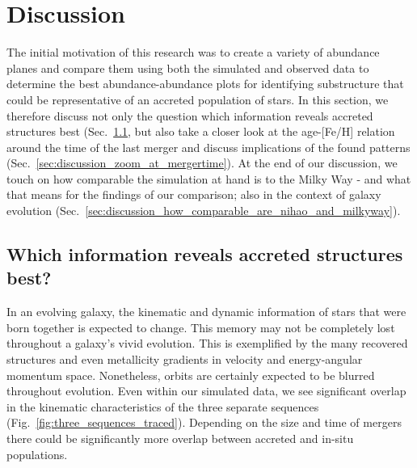 \documentclass[fleqn,usenatbib]{mnras}
\begin{document}
\section{Discussion} \label{sec:discussion}

The initial motivation of this research was to create a variety of abundance planes and compare them using both the simulated and observed data to determine the best abundance-abundance plots for identifying substructure that could be representative of an accreted population of stars. In this section, we therefore discuss not only the question which information reveals accreted structures best (Sec.~\ref{sec:discussion_best_information}, but also take a closer look at the age-[Fe/H] relation around the time of the last merger and discuss implications of the found patterns (Sec.~\ref{sec:discussion_zoom_at_mergertime}). At the end of our discussion, we touch on how comparable the simulation at hand is to the Milky Way - and what that means for the findings of our comparison; also in the context of galaxy evolution (Sec.~\ref{sec:discussion_how_comparable_are_nihao_and_milkyway}).

\subsection{Which information reveals accreted structures best?} \label{sec:discussion_best_information}

In an evolving galaxy, the kinematic and dynamic information of stars that were born together is expected to change. This memory may not be completely lost throughout a galaxy's vivid evolution. This is exemplified by the many recovered structures \citep{Deason2024} and even metallicity gradients \citep{Khoperskov2023d} in velocity and energy-angular momentum space. Nonetheless, orbits are certainly expected to be blurred throughout evolution. Even within our simulated data, we see significant overlap in the kinematic characteristics of the three separate sequences (Fig.~\ref{fig:three_sequences_traced}). Depending on the size and time of mergers there could be significantly more overlap between accreted and in-situ populations.
\end{document}
